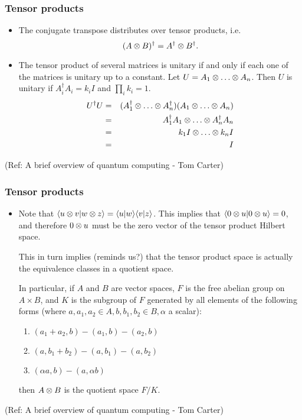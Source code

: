  \begin{frame}[fragile]\frametitle{Tensor products}

\begin{itemize}

	\item The conjugate transpose distributes over tensor products, i.e.
$$(A\otimes B)^\dag= A^\dag\otimes B^\dag.$$

	\item The tensor product of several matrices is unitary if and only if each one of the
matrices is unitary up to a constant.  Let $U = A_1\tensor \dots \tensor A_n$.  Then
$U$ is unitary if $A_i^\dag A_i = k_i I$ and $\prod_ik_i = 1$.
\begin{eqnarray*}U^\dag U &=& (A_1^\dag\tensor \dots \tensor A_n^\dag )(A_1\tensor \dots \tensor A_n)\\
&=& A_1^\dag A_1\tensor \dots \tensor A_n^\dag A_n\\
&=& k_1I\tensor \dots \tensor k_nI\\
&=& I\\
\end{eqnarray*}

\end{itemize}

\tiny{(Ref: A brief overview of quantum computing - Tom Carter)}

\end{frame}

 \begin{frame}[fragile]\frametitle{Tensor products}

\begin{itemize}
	\item Note that $\langle{u \otimes v}|{w \otimes z}\rangle = \langle{u}|{w}\rangle \langle{v}|{z}\rangle$.  
	This implies that $\langle{0 \otimes u}|{0 \otimes u}\rangle = 0$, and therefore $0 \otimes u$ must
	be the zero vector of the tensor product Hilbert space.
	
	This in turn implies (reminds us?) that the tensor product space is actually the equivalence
	classes in a quotient space.
	
	In particular, if $A$ and $B$ are vector spaces, $F$ is the free abelian group on $A\times B$,
	and $K$ is the subgroup of $F$ generated by all elements of the following forms (where \newline	
	$a, a_1, a_2\in A, b, b_1, b_2\in B, \alpha$ a scalar):
	\begin{enumerate}
		\item $(a_1 + a_2,b) - (a_1,b) - (a_2,b)$
		\item $(a,b_1 + b_2) - (a,b_1) - (a,b_2)$
		\item $(\alpha a,b) - (a,\alpha b)$
	\end{enumerate}
	then $A\otimes B$ is the quotient space $F/K$.
	 
\end{itemize}

\tiny{(Ref: A brief overview of quantum computing - Tom Carter)}

\end{frame}

